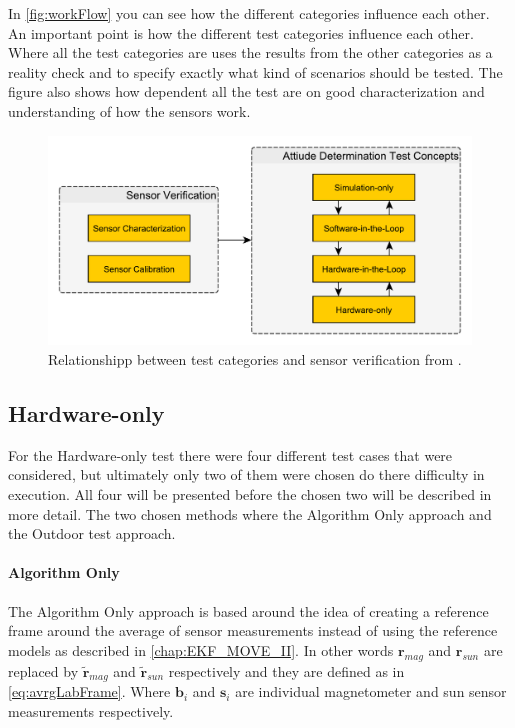 In \autoref{fig:workFlow} you can see how the different categories influence each other. An important point is how the different test categories influence each other. Where all the test categories are uses the results from the other categories as a reality check and to specify exactly what kind of scenarios should be tested. The figure also shows how dependent all the test are on good characterization and understanding of how the sensors work. 

\begin{figure}[tbp]
	\centering
	\includegraphics[width=0.7\columnwidth]{./Pictures/testing_concept}
	\caption{Relationshipp between test categories and sensor verification from \cite{DavidThesis}.}
	\label{fig:workFlow}
\end{figure}            

\subsection{Hardware-only}\label{chap:HardwareOnly}
For the Hardware-only test there were four different test cases that were considered, but ultimately only two of them were chosen do there difficulty in execution. All four will be presented before the chosen two will be described in more detail. The two chosen methods where the Algorithm Only approach and the Outdoor test approach.   

\paragraph{Algorithm Only}
The Algorithm Only approach is based around the idea of creating a reference frame around the average of sensor measurements instead of using the reference models as described in \autoref{chap:EKF_MOVE_II}. In other words $\boldsymbol{r}_{mag}$ and $\boldsymbol{r}_{sun}$ are replaced by $\tilde{\boldsymbol{r}}_{mag}$ and $\tilde{\boldsymbol{r}}_{sun}$ respectively and they are defined as in \autoref{eq:avrgLabFrame}. Where $\boldsymbol{b}_i$ and $\boldsymbol{s}_i$ are individual magnetometer and sun sensor measurements respectively.  

